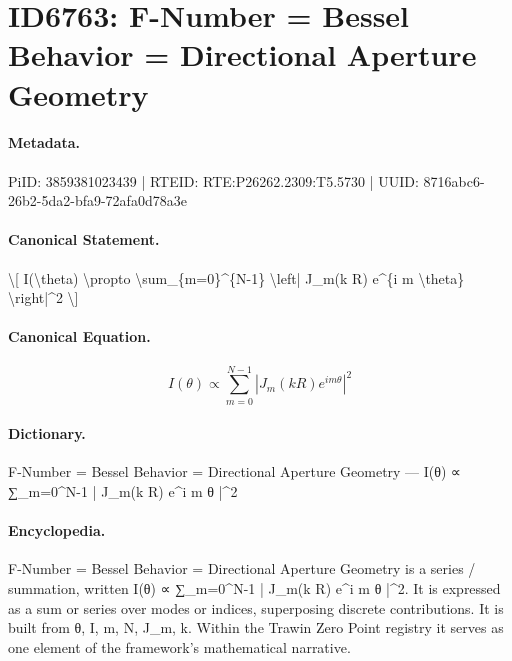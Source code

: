 \section*{ID6763: F-Number = Bessel Behavior = Directional Aperture Geometry}
\paragraph{Metadata.}
PiID: 3859381023439 | RTEID: RTE:P26262.2309:T5.5730 | UUID: 8716abc6-26b2-5da2-bfa9-72afa0d78a3e

\paragraph{Canonical Statement.}
\textbackslash{}[ I(\textbackslash{}theta) \textbackslash{}propto \textbackslash{}sum\_\{m=0\}\textasciicircum{}\{N-1\} \textbackslash{}left| J\_m(k R) e\textasciicircum{}\{i m \textbackslash{}theta\} \textbackslash{}right|\textasciicircum{}2 \textbackslash{}]

\paragraph{Canonical Equation.}
\[
I(\theta) \propto \sum_{m=0}^{N-1} \left| J_m(k R) e^{i m \theta} \right|^2
\]

\paragraph{Dictionary.}
F-Number = Bessel Behavior = Directional Aperture Geometry — I(θ) ∝ ∑\_m=0\textasciicircum{}N-1 | J\_m(k R) e\textasciicircum{}i m θ |\textasciicircum{}2

\paragraph{Encyclopedia.}
F-Number = Bessel Behavior = Directional Aperture Geometry is a series / summation, written I(θ) ∝ ∑\_m=0\textasciicircum{}N-1 | J\_m(k R) e\textasciicircum{}i m θ |\textasciicircum{}2. It is expressed as a sum or series over modes or indices, superposing discrete contributions. It is built from θ, I, m, N, J\_m, k. Within the Trawin Zero Point registry it serves as one element of the framework's mathematical narrative.
